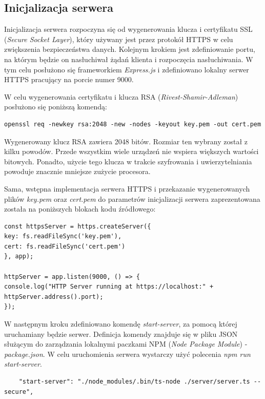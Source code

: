 \subsection{Inicjalizacja serwera}
Inicjalizacja serwera rozpoczyna się od wygenerowania klucza i certyfikatu SSL (\textit{Secure Socket Layer}), który używany jest przez protokół HTTPS w celu zwiększenia bezpieczeństwa danych. Kolejnym krokiem jest zdefiniowanie portu, na którym będzie on nasłuchiwał żądań klienta i rozpoczęcia nasłuchiwania. W tym celu posłużono się frameworkiem \textit{Express.js} i zdefiniowano lokalny serwer HTTPS pracujący na porcie numer 9000. 

W celu wygenerowania certyfikatu i klucza RSA (\textit{Rivest-Shamir-Adleman}) posłużono się poniższą komendą:

\begin{verbatim}
openssl req -newkey rsa:2048 -new -nodes -keyout key.pem -out cert.pem
\end{verbatim}

Wygenerowany klucz RSA zawiera 2048 bitów. Rozmiar ten wybrany został z kilku powodów. Przede wszystkim wiele urządzeń nie wspiera większych wartości bitowych. Ponadto, użycie tego klucza w trakcie szyfrowania i uwierzytelniania powoduje znacznie mniejsze zużycie procesora. 

Sama, wstępna implementacja serwera HTTPS i przekazanie wygenerowanych plików \textit{key.pem} oraz \textit{cert.pem} do parametrów inicjalizacji serwera  zaprezentowana została na poniższych blokach kodu źródłowego:

\begin{verbatim}
const httpsServer = https.createServer({
key: fs.readFileSync('key.pem'),
cert: fs.readFileSync('cert.pem')
}, app);

httpServer = app.listen(9000, () => {
console.log("HTTP Server running at https://localhost:" + 
httpServer.address().port);
});
\end{verbatim}

W następnym kroku zdefiniowano komendę \textit{start-server}, za pomocą której uruchamiany będzie serwer. Definicja komendy znajduje się w pliku JSON służącym do zarządzania lokalnymi paczkami NPM (\textit{Node Package Module}) - \textit{package.json}. W celu uruchomienia serwera wystarczy użyć polecenia \textit{npm run start-server}. 

\begin{verbatim}
	"start-server": "./node_modules/.bin/ts-node ./server/server.ts --secure",
\end{verbatim}

